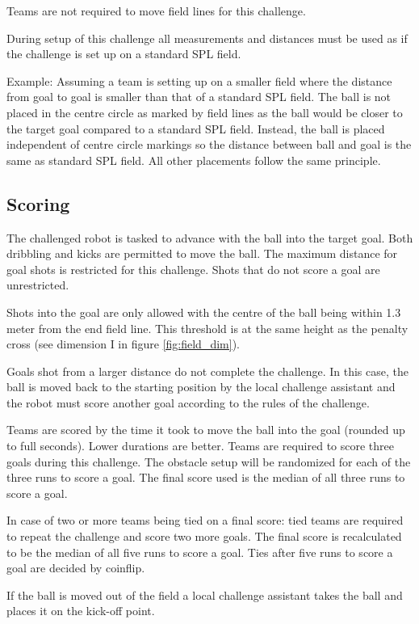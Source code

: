Teams are not required to move field lines for this challenge.

During setup of this challenge all measurements and distances must be used as if the challenge is set up on a standard SPL field.

Example: Assuming a team is setting up on a smaller field where the distance from goal to goal is smaller than that of a standard SPL field. The ball is not placed in the centre circle as marked by field lines as the ball would be closer to the target goal compared to a standard SPL field. Instead, the ball is placed independent of centre circle markings so the distance between ball and goal is the same as standard SPL field. All other placements follow the same principle.


\subsection{Scoring}

The challenged robot is tasked to advance with the ball into the target goal. Both dribbling and kicks are permitted to move the ball. The maximum distance for goal shots is restricted for this challenge. Shots that do not score a goal are unrestricted.

Shots into the goal are only allowed with the centre of the ball being within 1.3 meter from the end field line. This threshold is at the same height as the penalty cross (see dimension I in figure \ref{fig:field_dim}).

Goals shot from a larger distance do not complete the challenge. In this case, the ball is moved back to the starting position by the local challenge assistant and the robot must score another goal according to the rules of the challenge.

Teams are scored by the time it took to move the ball into the goal (rounded up to full seconds). Lower durations are better. Teams are required to score three goals during this challenge. The obstacle setup will be randomized for each of the three runs to score a goal. The final score used is the median of all three runs to score a goal. 

In case of two or more teams being tied on a final score: tied teams are required to repeat the challenge and score two more goals. The final score is recalculated to be the median of all five runs to score a goal. Ties after five runs to score a goal are decided by coinflip.

If the ball is moved out of the field a local challenge assistant takes the ball and places it on the kick-off point.

